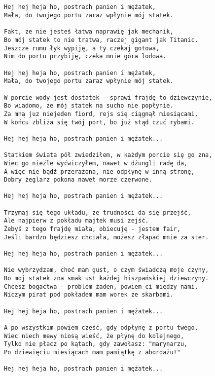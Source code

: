 \documentclass[12pt]{article}
\begin{document}
\subsection*{}
\begin{verbatim}
Hej hej heja ho, postrach panien i mężatek,
Mała, do twojego portu zaraz wpłynie mój statek.

Fakt, że nie jesteś łatwa naprawię jak mechanik,
Bo mój statek to nie tratwa, raczej gigant jak Titanic.
Jeszcze rumu łyk wypiję, a ty czekaj gotowa,
Nim do portu przybiję, czeka mnie góra lodowa.

Hej hej heja ho, postrach panien i mężatek,
Mała, do twojego portu zaraz wpłynie mój statek.

W porcie wody jest dostatek - sprawi frajdę to dziewczynie,
Bo wiadomo, że mój statek na sucho nie popłynie.
Za mną juz niejeden fiord, rejs się ciągnął miesiącami,
W końcu zbliża się twój port, bo już stąd czuć rybami.

Hej hej heja ho, postrach panien i mężatek...

Statkiem świata pół zwiedziłem, w każdym porcie się go zna,
Wiec go nieźle wyćwiczyłem, nawet w dżungli radę da,
A więc nie bądź przerażona, nie odpłynę w inną stronę,
Dobry żeglarz pokona nawet morze czerwone.

Hej hej heja ho, postrach panien i mężatek...

Trzymaj się tego układu, że trudności da się przejść,
Ale najpierw z pokładu majtek musi zejść.
Żebyś z tego frajdę miała, obiecuję - jestem fair,
Jeśli bardzo będziesz chciała, możesz złapać mnie za ster.

Hej hej heja ho, postrach panien i mężatek...

Nie wybrzydzam, choć mam gust, o czym świadczą moje czyny,
Bo moj statek zna smak ust każdej hiszpańskiej dziewczyny.
Chcesz bogactwa - problem żaden, powiem ci między nami,
Niczym pirat pod pokładem mam worek ze skarbami.

Hej hej heja ho, postrach panien i mężatek...

A po wszystkim powiem cześć, gdy odpłynę z portu twego,
Wiec niech mewy niosą wieść, że płynę do kolejnego,
Tylko nie płacz po kątach, gdy zawołasz: "marynarzu,
Po dziewięciu miesiącach mam pamiątkę z abordażu!"

Hej hej heja ho, postrach panien i mężatek...
\end{verbatim}
\clearpage
\end{document}
